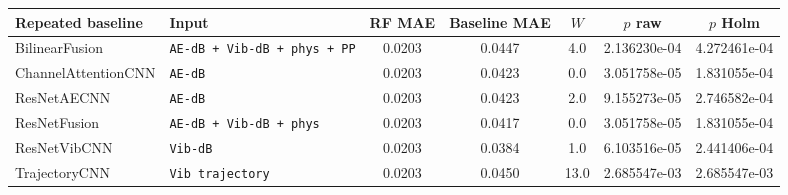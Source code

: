 \begin{tabular}{@{}llccccc@{}}
\toprule
Repeated baseline & Input & RF MAE & Baseline MAE & $W$ & $p$ raw & $p$ Holm \\
\midrule
BilinearFusion & \texttt{AE-dB + Vib-dB + phys + PP} & 0.0203 & 0.0447 & 4.0 & 2.136230e-04 & 4.272461e-04 \\
ChannelAttentionCNN & \texttt{AE-dB} & 0.0203 & 0.0423 & 0.0 & 3.051758e-05 & 1.831055e-04 \\
ResNetAECNN & \texttt{AE-dB} & 0.0203 & 0.0423 & 2.0 & 9.155273e-05 & 2.746582e-04 \\
ResNetFusion & \texttt{AE-dB + Vib-dB + phys} & 0.0203 & 0.0417 & 0.0 & 3.051758e-05 & 1.831055e-04 \\
ResNetVibCNN & \texttt{Vib-dB} & 0.0203 & 0.0384 & 1.0 & 6.103516e-05 & 2.441406e-04 \\
TrajectoryCNN & \texttt{Vib trajectory} & 0.0203 & 0.0450 & 13.0 & 2.685547e-03 & 2.685547e-03 \\
\bottomrule
\end{tabular}
